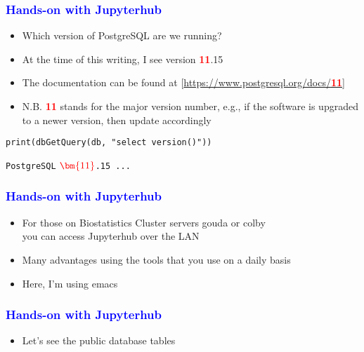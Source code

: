\documentclass[11pt,pdftex,dvipsnames,usenames]{beamer}
\begin{document}
\begin{frame}[fragile]\frametitle{\bf\textcolor{blue}{Hands-on with Jupyterhub}}
\begin{itemize}
\item Which version of PostgreSQL are we running?
\item At the time of this writing, I see version \textbf{\textcolor{red}{11}}.15
\item The documentation can be found at
\textcolor{PineGreen}{[\href{https://www.postgresql.org/docs/11}
{https://www.postgresql.org/docs/\textbf{\textcolor{red}{11}}}]}
\item N.B. \textbf{\textcolor{red}{11}} stands for the major version number, e.g.,
if the software is upgraded to a newer version, then update accordingly
\end{itemize}
\begin{lstlisting}[style=customR]
print(dbGetQuery(db, "select version()"))
\end{lstlisting}
\texttt{PostgreSQL} $\textcolor{red}{\bm{11}}$\texttt{.15 ...}
\end{frame}

\begin{frame}[fragile]\frametitle{\bf\textcolor{blue}{Hands-on with Jupyterhub}}
\begin{itemize}
\item For those on Biostatistics Cluster servers gouda or colby\\
you can access Jupyterhub over the LAN
\item Many advantages using the 
tools that you use on a daily basis 
\item Here, I'm using emacs
\end{itemize}

\end{frame}

\begin{frame}[fragile]\frametitle{\bf\textcolor{blue}{Hands-on with Jupyterhub}}
\begin{itemize}
\item Let's see the public database tables
\end{itemize}

\end{frame}
\end{document}
